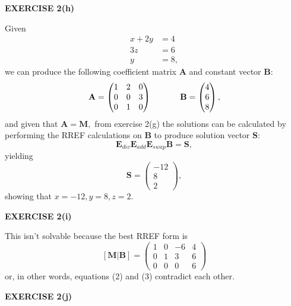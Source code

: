 \documentclass[12pt]{article}
\newcommand{\mat}[1]{\mathbf{#1}}
\newcommand{\exercise}[1]{\textbf{EXERCISE #1}\label{#1}}
\begin{document}
\exercise{2(h)}

Given
\begin{align*}
x + 2y &= 4 \\
3z &= 6 \\
y &= 8,
\end{align*}
we can produce the following coefficient matrix $\mat{A}$ and constant vector $\mat{B}$:
\begin{equation*}
\mat{A} = 
\begin{pmatrix} 
1 & 2 & 0 \\ 
0 & 0 & 3 \\ 
0 & 1 & 0 
\end{pmatrix} 
\hspace{0.10\linewidth} 
\mat{B} = 
\begin{pmatrix} 
4 \\ 6 \\ 8
\end{pmatrix},
\end{equation*}
and given that $\mat{A} = \mat{M},$ from exercise 2(g) the solutions can be calculated by performing the RREF calculations on $\mat{B}$ to produce solution vector $\mat{S}$:
\begin{equation*}
\mat{E}_{div} \mat{E}_{add} \mat{E}_{swap} \mat{B} = \mat{S},
\end{equation*}
yielding
\begin{equation*}
\mat{S} = \begin{pmatrix} -12 \\ 8 \\ 2 \end{pmatrix},
\end{equation*}
showing that $x=-12, y = 8, z=2$.

\exercise{2(i)}

This isn't solvable because the best RREF form is
\begin{equation*}
\mat{[M | B]} = 
\begin{pmatrix}
1 & 0 & -6 & 4 \\
0 & 1 &  3 & 6 \\
0 & 0 &  0 & 6 
\end{pmatrix}
\end{equation*}
or, in other words, equations (2) and (3) contradict each other.

\exercise{2(j)}
\end{document}

